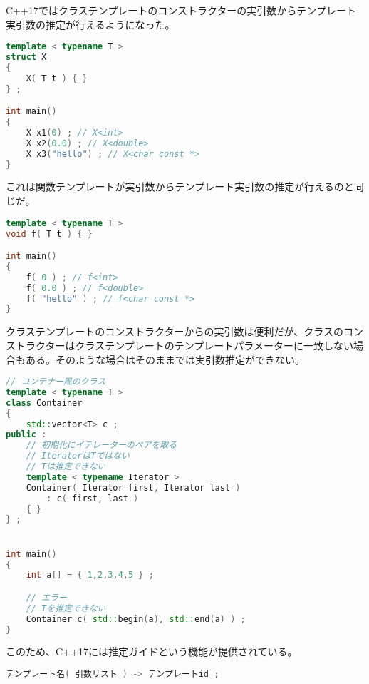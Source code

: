%

C++17ではクラステンプレートのコンストラクターの実引数からテンプレート実引数の推定が行えるようになった。

\begin{lstlisting}[language=C++]
template < typename T >
struct X
{
    X( T t ) { }
} ;

int main()
{
    X x1(0) ; // X<int>
    X x2(0.0) ; // X<double>
    X x3("hello") ; // X<char const *>
}
\end{lstlisting}

これは関数テンプレートが実引数からテンプレート実引数の推定が行えるのと同じだ。

\begin{lstlisting}[language=C++]
template < typename T >
void f( T t ) { }

int main()
{
    f( 0 ) ; // f<int>
    f( 0.0 ) ; // f<double>
    f( "hello" ) ; // f<char const *>
}
\end{lstlisting}

%

クラステンプレートのコンストラクターからの実引数は便利だが、クラスのコンストラクターはクラステンプレートのテンプレートパラメーターに一致しない場合もある。そのような場合はそのままでは実引数推定ができない。

\begin{lstlisting}[language=C++]
// コンテナー風のクラス
template < typename T >
class Container
{
    std::vector<T> c ;
public :
    // 初期化にイテレーターのペアを取る
    // IteratorはTではない
    // Tは推定できない
    template < typename Iterator >
    Container( Iterator first, Iterator last )
        : c( first, last )
    { }
} ;


int main()
{
    int a[] = { 1,2,3,4,5 } ;

    // エラー
    // Tを推定できない
    Container c( std::begin(a), std::end(a) ) ;
}
\end{lstlisting}

このため、C++17には推定ガイドという機能が提供されている。

\begin{lstlisting}[language=C++]
テンプレート名( 引数リスト ) -> テンプレートid ;
\end{lstlisting}

